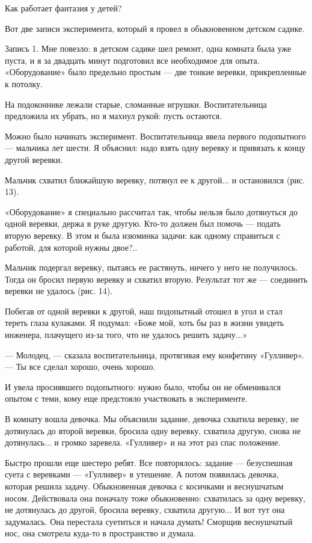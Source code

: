 Как работает фантазия у детей?

Вот две записи  эксперимента, который я провел  в обыкновенном детском
садике.

Запись 1. Мне повезло: в детском  садике шел ремонт, одна комната была
уже  пуста, и  я  за  двадцать минут  подготовил  все необходимое  для
опыта.  «Оборудование» было  предельно простым  — две  тонкие веревки,
прикрепленные к потолку.

На  подоконнике  лежали  старые,  сломанные  игрушки.  Воспитательница
предложила их убрать, но я махнул рукой: пусть остаются.

Можно  было   начинать  эксперимент.  Воспитательница   ввела  первого
подопытного — мальчика лет шести.  Я объяснил: надо взять одну веревку
и привязать к концу другой веревки.

Мальчик  схватил   ближайшую  веревку,   потянул  ее  к   другой...  и
остановился (рис. 13).

«Оборудование»  я   специально  рассчитал   так,  чтобы   нельзя  было
дотянуться до  одной веревки, держа  в руке другую. Кто-то  должен был
помочь —  подать вторую веревку.  В этом  и была изюминка  задачи: как
одному справиться с работой, для которой нужны двое?..


Мальчик  подергал веревку,  пытаясь  ее растянуть,  ничего  у него  не
получилось. Тогда он бросил первую веревку и схватил вторую. Результат
тот же — соединить веревки не удалось (рис. 14).

Побегав от  одной веревки  к другой,  наш подопытный  отошел в  угол и
стал  тереть глаза  кулаками.  Я подумал:  «Боже мой,  хоть  бы раз  в
жизни увидеть  инженера, плачущего из-за  того, что не  удалось решить
задачу...»

—  Молодец,  —  сказала   воспитательница,  протягивая  ему  конфетину
«Гулливер». — Ты все сделал хорошо, очень хорошо.

И увела просиявшего  подопытного: нужно было, чтобы  он не обменивался
опытом с теми, кому еще предстояло участвовать в эксперименте.

В  комнату  вошла  девочка.  Мы объяснили  задание,  девочка  схватила
веревку,  не  дотянулась  до  второй веревки,  бросила  одну  веревку,
схватила другую, снова не  дотянулась... и громко заревела. «Гулливер»
и на этот раз спас положение.

Быстро  прошли   еще  шестеро   ребят.  Все  повторялось:   задание  —
безуспешная  суета  с  веревками  — «Гулливер»  в  утешение.  А  потом
появилась  девочка,   которая  решила  задачу.   Обыкновенная  девочка
с  косичками  и  веснушчатым  носом.  Действовала  она  поначалу  тоже
обыкновенно:  схватилась за  одну  веревку, не  дотянулась до  другой,
бросила  веревку, схватила  другую... И  вот тут  она задумалась.  Она
перестала  суетиться и  начала  думать! Сморщив  веснушчатый нос,  она
смотрела куда-то в пространство и думала.

